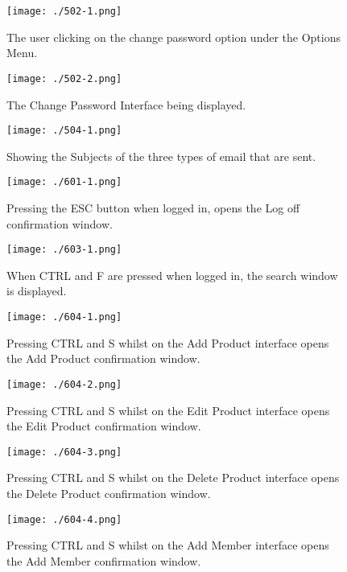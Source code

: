 \begin{figure}[H]
    \texttt{[image: ./502-1.png]}
    \caption{ The user clicking on the change password option under the Options Menu. } \label{fig:502-1}
\end{figure}

\begin{figure}[H]
    \texttt{[image: ./502-2.png]}
    \caption{The Change Password Interface being displayed.} \label{fig:502-2}
\end{figure}

\begin{figure}[H]
    \texttt{[image: ./504-1.png]}
    \caption{Showing the Subjects of the three types of email that are sent.} \label{fig:504-1}
\end{figure}

\begin{figure}[H]
    \texttt{[image: ./601-1.png]}
    \caption{Pressing the ESC button when logged in, opens the Log off confirmation window.} \label{fig:601-1}
\end{figure}

\begin{figure}[H]
    \texttt{[image: ./603-1.png]}
    \caption{When CTRL and F are pressed when logged in, the search window is displayed.} \label{fig:603-1}
\end{figure}

\begin{figure}[H]
    \texttt{[image: ./604-1.png]}
    \caption{Pressing CTRL and S whilst on the Add Product interface opens the Add Product confirmation window.} \label{fig:604-1}
\end{figure}

\begin{figure}[H]
    \texttt{[image: ./604-2.png]}
    \caption{Pressing CTRL and S whilst on the Edit Product interface opens the Edit Product confirmation window.} \label{fig:604-2}
\end{figure}

\begin{figure}[H]
    \texttt{[image: ./604-3.png]}
    \caption{Pressing CTRL and S whilst on the Delete Product interface opens the Delete Product confirmation window.} \label{fig:604-3}
\end{figure}

\begin{figure}[H]
    \texttt{[image: ./604-4.png]}
    \caption{Pressing CTRL and S whilst on the Add Member interface opens the Add Member confirmation window.} \label{fig:604-4}
\end{figure}

